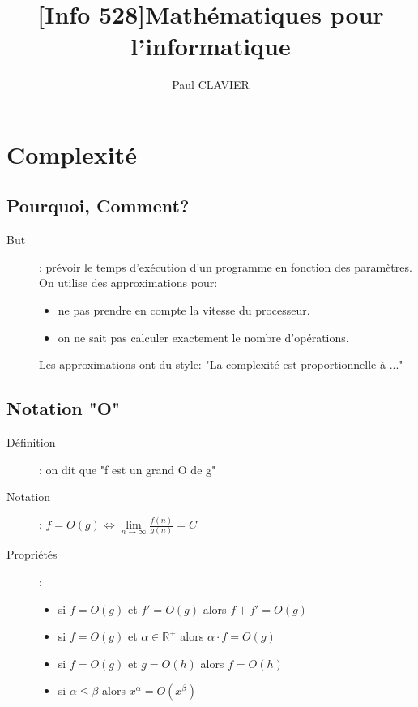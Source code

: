 \documentclass[10pt,a4paper]{article}
\author{Paul CLAVIER}
\title{[Info 528]Mathématiques pour l'informatique}
\begin{document}
\maketitle
\newpage
\tableofcontents
\newpage
\section{Complexité}
	\subsection{Pourquoi, Comment?}
		\begin{description}
			\item[But]: prévoir le temps d’exécution d'un programme en fonction des paramètres. On utilise des approximations pour:
			\begin{itemize}
				\item ne pas prendre en compte la vitesse du processeur.
				\item on ne sait pas calculer exactement le nombre d'opérations.
			\end{itemize}
			\item[] Les approximations ont du style: "La complexité est proportionnelle à ..."
		\end{description}
	\subsection{Notation "O"}
		\begin{description}
			\item[Définition]: on dit que "f est un grand O de g"
			\item[Notation]: $f = O(g) \Leftrightarrow \lim\limits_{n\to\infty}\frac{f(n)}{g(n)} = C$
			\item[Propriétés]:
				\begin{itemize}
					\item si $f = O(g)$ et $f' = O(g)$ alors $f+f' = O(g)$
					\item si $f = O(g)$ et $\alpha\in\mathbb{R}^+$ alors $\alpha\cdot f = O(g)$
					\item si $f = O(g)$ et $g = O(h)$ alors $f = O(h)$
					\item si $\alpha\leq\beta$ alors $x^\alpha = O(x^\beta)$
				\end{itemize}
		\end{description}
\end{document}
